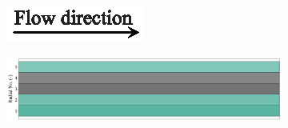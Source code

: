 \documentclass[preprint,12pt]{elsarticle}
\begin{document}
\begin{figure}
     \centering
     \begin{subfigure}[b]{\textwidth}
     	\includegraphics[width=\textwidth]{flow_dir.eps}
     \end{subfigure}
     \begin{subfigure}[b]{0.85\textwidth}
\includegraphics[width=\textwidth]{results/segments/5seg/60C40T/seg.png}
     \end{subfigure}
     \hfill
     \begin{subfigure}[b]{0.1\textwidth}

\end{subfigure}
\end{figure}
\end{document}
